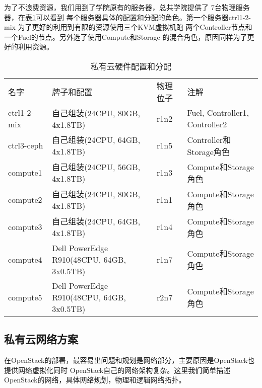 为了不浪费资源，我们用到了学院原有的服务器，总共学院提供了
7台物理服务器，在表\ref{tab:hardware-table}可以看到
每个服务器具体的配置和分配的角色。第一个服务器ctrl1-2-mix
为了更好的利用到有限的资源使用三个KVM虚拟机跑
两个Controller节点和一个Fuel的节点。另外选了使用Compute和Storage
的混合角色，原因同样为了更好的利用资源。
\begin{table}[H]
  \centering
  \begin{minipage}[t]{0.98\linewidth} %
  \caption[私有云硬件配置和分配]{私有云硬件配置和分配}
  \label{tab:hardware-table}
    \begin{tabularx}{\linewidth}{lXlX}
      \toprule[1.5pt]
        名字 & 牌子和配置 &  物理位子 & 注解\\
        ctrl1-2-mix & 自己组装\newline(24CPU, 80GB, 4x1.8TB) & r1n2 & Fuel, Controller1, Controller2  \\
        ctrl3-ceph & 自己组装\newline(24CPU, 64GB, 4x1.8TB) & r1n5 & Controller和Storage角色  \\
        compute1 & 自己组装\newline(24CPU, 56GB, 4x1.8TB) & r1n3 & Compute和Storage角色  \\
        compute2 & 自己组装\newline(24CPU, 80GB, 4x1.8TB) & r1n1 & Compute和Storage角色  \\
        compute3 & 自己组装\newline(24CPU, 64GB, 4x1.8TB) & r1n4 & Compute和Storage角色  \\
        compute4 & Dell PowerEdge R910\newline(48CPU, 64GB, 3x0.5TB) & r1n7 & Compute和Storage角色  \\
        compute5 & Dell PowerEdge R910\newline(48CPU, 64GB, 3x0.5TB) & r2n7 & Compute和Storage角色  \\
      \bottomrule[1.5pt]
    \end{tabularx}
  \end{minipage}
\end{table}


\subsection{私有云网络方案}
在OpenStack的部署，最容易出问题和规划是网络部分，主要原因是OpenStack也提供网络虚拟化同时
OpenStack自己的网络架构复杂。这里我们简单描述OpenStack的网络，具体网络规划，物理和逻辑网络拓扑。

